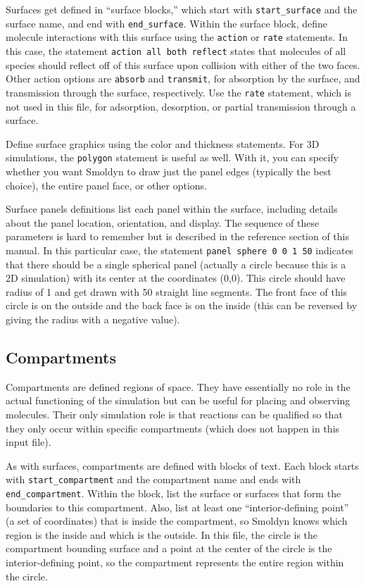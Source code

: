 \documentclass {scrbook}
\newcommand {\ttt} {\texttt}
\begin{document}
Surfaces get defined in ``surface blocks,'' which start with  \ttt{start\_surface} and the surface name, and end with  \ttt{end\_surface}. Within the surface block, define molecule interactions with this surface using the  \ttt{action} or  \ttt{rate} statements. In this case, the statement  \ttt{action all both reflect} states that molecules of all species should reflect off of this surface upon collision with either of the two faces. Other action options are  \ttt{absorb} and  \ttt{transmit}, for absorption by the surface, and transmission through the surface, respectively. Use the  \ttt{rate} statement, which is not used in this file, for adsorption, desorption, or partial transmission through a surface.

Define surface graphics using the color and thickness statements. For 3D simulations, the  \ttt{polygon} statement is useful as well. With it, you can specify whether you want Smoldyn to draw just the panel edges (typically the best choice), the entire panel face, or other options.

Surface panels definitions list each panel within the surface, including details about the panel location, orientation, and display. The sequence of these parameters is hard to remember but is described in the reference section of this manual. In this particular case, the statement  \ttt{panel sphere 0 0 1 50} indicates that there should be a single spherical panel (actually a circle because this is a 2D simulation) with its center at the coordinates (0,0). This circle should have radius of 1 and get drawn with 50 straight line segments. The front face of this circle is on the outside and the back face is on the inside (this can be reversed by giving the radius with a negative value).

\subsection*{Compartments}

Compartments are defined regions of space. They have essentially no role in the actual functioning of the simulation but can be useful for placing and observing molecules. Their only simulation role is that reactions can be qualified so that they only occur within specific compartments (which does not happen in this input file).

As with surfaces, compartments are defined with blocks of text. Each block starts with  \ttt{start\_compartment} and the compartment name and ends with  \ttt{end\_compartment}. Within the block, list the surface or surfaces that form the boundaries to this compartment. Also, list at least one ``interior-defining point'' (a set of coordinates) that is inside the compartment, so Smoldyn knows which region is the inside and which is the outside. In this file, the circle is the compartment bounding surface and a point at the center of the circle is the interior-defining point, so the compartment represents the entire region within the circle.
\end{document}
